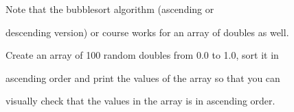 Note that the bubblesort algorithm (ascending or

descending version) or course works for an array of doubles as well.

Create an array of 100 random doubles from 0.0 to 1.0, sort it in

ascending order and print the values of the array so that you can

visually check that the values in the array is in ascending order.

